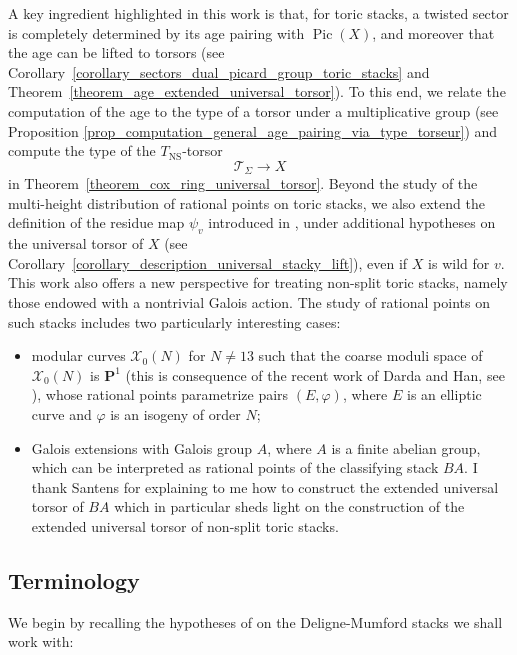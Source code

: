 \documentclass{proc-l}
\newcommand{\Proj}{\mathbf{P}}
\DeclareMathOperator{\Pic}{Pic}
\DeclareMathOperator{\NS}{NS}
\newcommand{\stackT}{\mathcal{T}}
\theoremstyle{definition}
\theoremstyle{remark}
\numberwithin{equation}{section}
\begin{document}
A key ingredient highlighted in this work is that, for toric stacks, a twisted sector is completely determined by its age pairing with $\Pic(X)$, and moreover that the age can be lifted to torsors (see Corollary~\ref{corollary_sectors_dual_picard_group_toric_stacks} and Theorem~\ref{theorem_age_extended_universal_torsor}). To this end, we relate the computation of the age to the type of a torsor under a multiplicative group (see Proposition \ref{prop_computation_general_age_pairing_via_type_torseur}) and compute the type of the $T_{\NS}$-torsor
$$
\stackT_{\Sigma} \rightarrow X
$$
in Theorem~\ref{theorem_cox_ring_universal_torsor}. Beyond the study of the multi-height distribution of rational points on toric stacks, we also extend the definition of the residue map $\psi_v$ introduced in \cite[Definition 2.17]{darda2024batyrevmanin}, under additional hypotheses on the universal torsor of $X$ (see Corollary~\ref{corollary_description_universal_stacky_lift}), even if $X$ is wild for $v$. This work also offers a new perspective for treating non-split toric stacks, namely
those endowed with a nontrivial Galois action. The study of rational points on such
stacks includes two particularly interesting cases:
\begin{itemize}[label=--]
\item modular curves $\mathcal{X}_0(N)$ for $N \neq 13$ such that the coarse moduli space of $\mathcal{X}_0(N)$ is $\Proj^1$ (this is consequence of the recent work of Darda and Han, see \cite[Theorem 1.5]{darda2026stackybatyrevmaninconjecturemodular}), whose rational points
parametrize pairs $(E,\varphi)$, where $E$ is an elliptic curve and
$\varphi$ is an isogeny of order $N$;
\item Galois extensions with Galois group $A$, where $A$ is a finite abelian group,
which can be interpreted as rational points of the classifying stack $BA$. I thank Santens for explaining to me how to construct the extended universal torsor of $BA$ which in particular sheds light on the construction of the extended universal torsor of non-split toric stacks.
\end{itemize}





\subsection{Terminology}

We begin by recalling the hypotheses of \cite{darda2024batyrevmanin} on the Deligne-Mumford stacks we shall work with:
\end{document}
